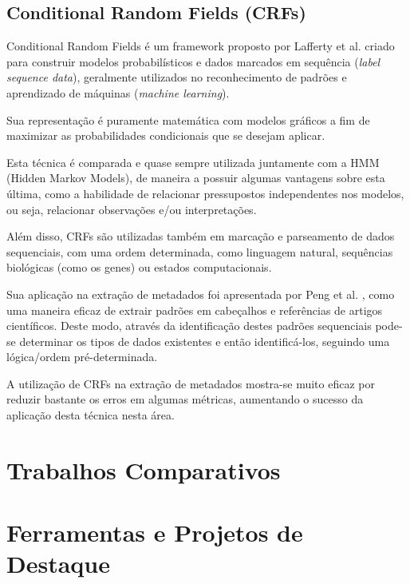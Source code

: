 \subsection{Conditional Random Fields (CRFs)}


Conditional Random Fields é um framework proposto por Lafferty et al. \cite{crf} criado para construir modelos probabilísticos e dados marcados em sequência (\textit{label sequence data}), geralmente utilizados no reconhecimento de padrões e aprendizado de máquinas (\textit{machine learning}).

Sua representação é puramente matemática com modelos gráficos a fim de maximizar as probabilidades condicionais que se desejam aplicar.

Esta técnica é comparada e quase sempre utilizada juntamente com a HMM (Hidden Markov Models), de maneira a possuir algumas vantagens sobre esta última, como a habilidade de relacionar pressupostos independentes nos modelos, ou seja, relacionar observações e/ou interpretações.

Além disso, CRFs são utilizadas também em marcação e parseamento de dados sequenciais, com uma ordem determinada, como linguagem natural, sequências biológicas (como os genes) ou estados computacionais.


Sua aplicação na extração de metadados foi apresentada por Peng et al. \cite{crf-ie}, como uma maneira eficaz de extrair padrões em cabeçalhos e referências de artigos científicos. Deste modo, através da identificação destes padrões sequenciais pode-se determinar os tipos de dados existentes e então identificá-los, seguindo uma lógica/ordem pré-determinada.

A utilização de CRFs na extração de metadados mostra-se muito eficaz por reduzir bastante os erros em algumas métricas, aumentando o sucesso da aplicação desta técnica nesta área.

\section{Trabalhos Comparativos}


\section{Ferramentas e Projetos de Destaque}

